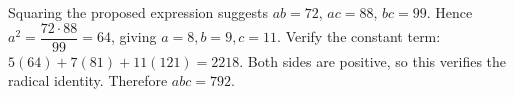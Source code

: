 Squaring the proposed expression suggests $ab=72$, $ac=88$, $bc=99$. Hence $a^2=\dfrac{72\cdot88}{99}=64$, giving $a=8,b=9,c=11$. Verify the constant term: $5(64)+7(81)+11(121)=2218$. Both sides are positive, so this verifies the radical identity. Therefore $\boxed{abc=792}$.
